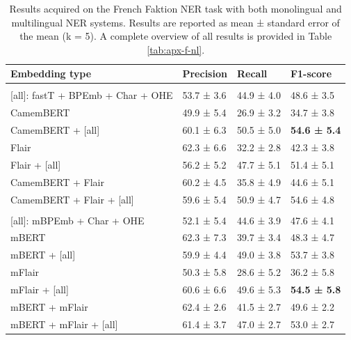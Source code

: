 \documentclass[12pt,a4paper,]{book}
\begin{document}
\begin{table}

\caption{\label{tab:faktion-fr-tab}Results acquired on the French Faktion NER task with both monolingual and multilingual NER systems. Results are reported as mean ± standard error of the mean (k = 5). A complete overview of all results is provided in Table \ref{tab:apx-f-nl}.}
\centering
\begin{tabular}[t]{llll}
\toprule
Embedding type & Precision & Recall & F1-score\\
\midrule
\addlinespace[0.3em]
\multicolumn{4}{l}{\textbf{Monolingual embeddings}}\\
\hspace{1em}[all]: fastT + BPEmb + Char + OHE & 53.7 ± 3.6 & 44.9 ± 4.0 & 48.6 ± 3.5\\
\hspace{1em}CamemBERT & 49.9 ± 5.4 & 26.9 ± 3.2 & 34.7 ± 3.8\\
\hspace{1em}CamemBERT + [all] & 60.1 ± 6.3 & 50.5 ± 5.0 & \textbf{54.6 ± 5.4}\\
\hspace{1em}Flair & 62.3 ± 6.6 & 32.2 ± 2.8 & 42.3 ± 3.8\\
\hspace{1em}Flair + [all] & 56.2 ± 5.2 & 47.7 ± 5.1 & 51.4 ± 5.1\\
\hspace{1em}CamemBERT + Flair & 60.2 ± 4.5 & 35.8 ± 4.9 & 44.6 ± 5.1\\
\hspace{1em}CamemBERT + Flair + [all] & 59.6 ± 5.4 & 50.9 ± 4.7 & 54.6 ± 4.8\\
\addlinespace[0.3em]
\multicolumn{4}{l}{\textbf{Multilingual embeddings}}\\
\hspace{1em}[all]: mBPEmb + Char + OHE & 52.1 ± 5.4 & 44.6 ± 3.9 & 47.6 ± 4.1\\
\hspace{1em}mBERT & 62.3 ± 7.3 & 39.7 ± 3.4 & 48.3 ± 4.7\\
\hspace{1em}mBERT + [all] & 59.9 ± 4.4 & 49.0 ± 3.8 & 53.7 ± 3.8\\
\hspace{1em}mFlair & 50.3 ± 5.8 & 28.6 ± 5.2 & 36.2 ± 5.8\\
\hspace{1em}mFlair + [all] & 60.6 ± 6.6 & 49.6 ± 5.3 & \textbf{54.5 ± 5.8}\\
\hspace{1em}mBERT + mFlair & 62.4 ± 2.6 & 41.5 ± 2.7 & 49.6 ± 2.2\\
\hspace{1em}mBERT + mFlair + [all] & 61.4 ± 3.7 & 47.0 ± 2.7 & 53.0 ± 2.7\\
\bottomrule
\end{tabular}
\end{table}
\end{document}
